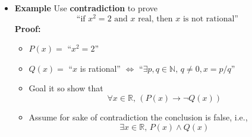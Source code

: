 \documentclass[11pt,twoside]{report}
\begin{document}
\begin{itemize}
\item \textbf{Example} Use \textbf{contradiction} to prove
\[
\text{``if $x^2 = 2$ and $x$ real, then $x$ is not rational''} 
\]
\textbf{Proof:} 
\begin{itemize}
\item $P(x) = $ ``$x^2 = 2$''
\item $Q(x) = $ ``$x$ is rational'' $\iff$ ``$\exists p,q \in \mathbb{N},\, q \ne 0, x = p/q$''
\item Goal it so show that
\[ \forall x \in \mathbb{R},\,   ( P(x) \to \neg Q(x)) 
\]


\item Assume for sake of contradiction the conclusion is false, i.e., 
\[
 \exists x \in \mathbb{R},\,   P(x) \wedge  Q(x)
\]



\end{itemize}
\end{itemize}
\end{document}
